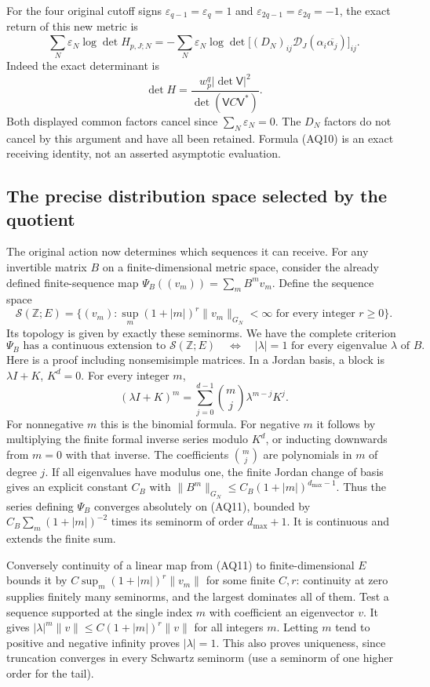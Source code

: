 \documentclass[11pt,a4paper]{article}
\theoremstyle{definition}\newtheorem{definition}[theorem]{Definition}
\begin{document}
For the four original cutoff signs
$\varepsilon_{q-1}=\varepsilon_q=1$ and
$\varepsilon_{2q-1}=\varepsilon_{2q}=-1$, the exact return of this
new metric is
\[
 \sum_N\varepsilon_N\log\det H_{p,J;N}
  =-\sum_N\varepsilon_N\log\det
   \big[(D_N)_{ij}\mathcal D_J(\alpha_i\overline{\alpha_j})\big]_{ij}.
 \tag{AQ10}
\]
Indeed the exact determinant is
\[
 \det H=\frac{w_p^q|\det\mathsf V|^2}{\det(\mathsf V C\mathsf V^*)}.
\]
Both displayed common factors cancel since $\sum_N\varepsilon_N=0$.
The $D_N$ factors do not
cancel by this argument and have all been retained. Formula (AQ10)
is an exact receiving identity, not an asserted asymptotic evaluation.

\subsection{The precise distribution space selected by the quotient}
The original action now determines which sequences it can receive.
For any invertible matrix $B$ on a finite-dimensional metric space,
consider the already defined finite-sequence map
$\Psi_B((v_m))=\sum_m B^mv_m$. Define the sequence space
\[
 \mathscr S(\mathbb Z;E)=
 \{(v_m):\sup_m(1+|m|)^r\|v_m\|_{G_N}<\infty
                   \text{ for every integer }r\ge0\}.
 \tag{AQ11}
\]
Its topology is given by exactly these seminorms. We have the complete
criterion
\[
 \Psi_B\text{ has a continuous extension to }\mathscr S(\mathbb Z;E)
 \quad\Longleftrightarrow\quad
 |\lambda|=1\text{ for every eigenvalue }\lambda\text{ of }B.
 \tag{AQ12}
\]
Here is a proof including nonsemisimple matrices. In a Jordan basis,
a block is $\lambda I+K$, $K^d=0$. For every integer $m$,
\[
 (\lambda I+K)^m
 =\sum_{j=0}^{d-1}\binom mj\lambda^{m-j}K^j.
 \tag{AQ13}
\]
For nonnegative $m$ this is the binomial formula. For negative $m$ it
follows by multiplying the finite formal inverse series modulo $K^d$,
or inducting downwards from $m=0$ with that inverse. The coefficients
$\binom mj$ are polynomials in $m$ of degree $j$. If all eigenvalues
have modulus one, the finite Jordan change of basis gives an explicit
constant $C_B$ with $\|B^m\|_{G_N}\le C_B(1+|m|)^{d_{\max}-1}$.
Thus the series defining $\Psi_B$ converges absolutely on (AQ11),
bounded by $C_B\sum_m(1+|m|)^{-2}$ times its seminorm of order
$d_{\max}+1$. It is continuous and extends the finite sum.

Conversely continuity of a linear map from (AQ11) to finite-dimensional
$E$ bounds it by $C\sup_m(1+|m|)^r\|v_m\|$ for some finite $C,r$:
continuity at zero supplies finitely many seminorms, and the largest
dominates all of them. Test a sequence supported at the single index
$m$ with coefficient an eigenvector $v$. It gives
$|\lambda|^m\|v\|\le C(1+|m|)^r\|v\|$ for all integers $m$.
Letting $m$ tend to positive and negative infinity proves $|\lambda|=1$.
This also proves uniqueness, since truncation converges in every
Schwartz seminorm (use a seminorm of one higher order for the tail).
\end{document}
